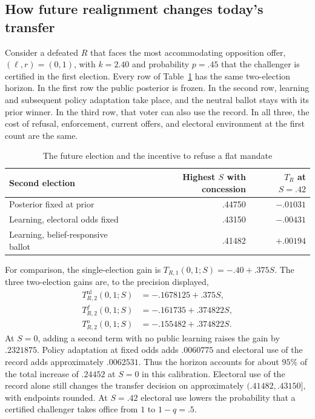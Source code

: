 \documentclass[11pt,letterpaper]{article}
\begin{document}
\subsection{How future realignment changes today's transfer}

Consider a defeated $R$ that faces the most accommodating opposition offer, $(\ell,r)=(0,1)$, with $k=2.40$ and probability $p=.45$ that the challenger is certified in the first election. Every row of Table~\ref{tab:flat} has the same two-election horizon. In the first row the public posterior is frozen. In the second row, learning and subsequent policy adaptation take place, and the neutral ballot stays with its prior winner. In the third row, that voter can also use the record. In all three, the cost of refusal, enforcement, current offers, and electoral environment at the first count are the same.
\begin{table}[htbp]\centering\small
\caption{The future election and the incentive to refuse a flat mandate}\label{tab:flat}
\smallskip
\begin{tabular}{@{}lrr@{}}\toprule
Second election & Highest $S$ with concession & $T_R$ at $S=.42$\\ \midrule
Posterior fixed at prior & .44750 & $-.01031$\\
Learning, electoral odds fixed & .43150 & $-.00431$\\
Learning, belief-responsive ballot & .41482 & $+.00194$\\ \bottomrule
\end{tabular}
\end{table}

For comparison, the single-election gain is $T_{R,1}(0,1;S)=-.40+.375S$. The three two-election gains are, to the precision displayed,
\begin{align}
 T_{R,2}^{\mathrm{nl}}(0,1;S) &= -.1678125+.375S,\nonumber\\
 T_{R,2}^{f}(0,1;S) &= -.161735+.374822S,\nonumber\\
 T_{R,2}^{o}(0,1;S) &= -.155482+.374822S.
 \label{eq:flatcompare}
\end{align}
At $S=0$, adding a second term with no public learning raises the gain by $.2321875$. Policy adaptation at fixed odds adds $.0060775$ and electoral use of the record adds approximately $.0062531$. Thus the horizon accounts for about $95\%$ of the total increase of $.24452$ at $S=0$ in this calibration. Electoral use of the record alone still changes the transfer decision on approximately $(.41482,.43150]$, with endpoints rounded. At $S=.42$ electoral use lowers the probability that a certified challenger takes office from $1$ to $1-q=.5$.
\end{document}
